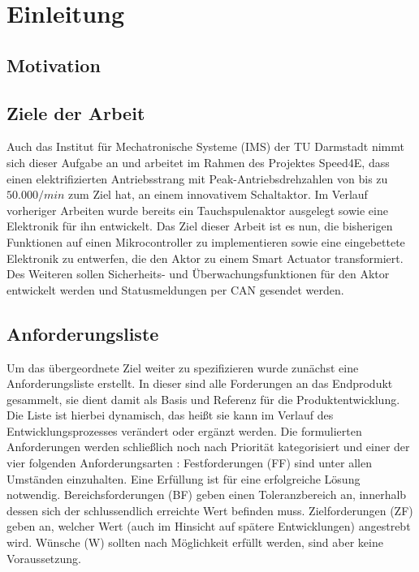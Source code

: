 \chapter{Einleitung}
\section{Motivation}


\section{Ziele der Arbeit}
Auch das Institut für Mechatronische Systeme (IMS) der TU Darmstadt nimmt sich dieser Aufgabe an und arbeitet im Rahmen des Projektes Speed4E, dass einen elektrifizierten Antriebsstrang mit Peak-Antriebsdrehzahlen von bis zu $50.000/min$ zum Ziel hat, an einem innovativem Schaltaktor. Im Verlauf vorheriger Arbeiten wurde bereits ein Tauchspulenaktor ausgelegt sowie eine Elektronik für ihn entwickelt. Das Ziel dieser Arbeit ist es nun, die bisherigen Funktionen auf einen Mikrocontroller zu implementieren sowie eine eingebettete Elektronik zu entwerfen, die den Aktor zu einem Smart Actuator transformiert. Des Weiteren sollen Sicherheits- und Überwachungsfunktionen für den Aktor entwickelt werden und Statusmeldungen per CAN gesendet werden. 

\section{Anforderungsliste}
Um das übergeordnete Ziel weiter zu spezifizieren wurde zunächst  eine Anforderungsliste erstellt. In dieser sind alle Forderungen an das Endprodukt gesammelt, sie dient damit als Basis und Referenz für die Produktentwicklung. Die Liste ist hierbei dynamisch, das heißt sie kann im Verlauf des Entwicklungsprozesses verändert oder ergänzt werden.  Die formulierten Anforderungen werden schließlich noch nach Priorität kategorisiert und einer der vier folgenden Anforderungsarten \cite[S. 189]{2013a}: Festforderungen (FF) sind unter allen Umständen einzuhalten. Eine Erfüllung ist für eine erfolgreiche Lösung notwendig.
Bereichsforderungen (BF) geben einen Toleranzbereich an, innerhalb dessen sich der schlussendlich erreichte Wert befinden muss.
Zielforderungen (ZF) geben an, welcher Wert (auch im Hinsicht auf spätere Entwicklungen) angestrebt wird.
Wünsche (W) sollten nach Möglichkeit erfüllt werden, sind aber keine Voraussetzung. 

